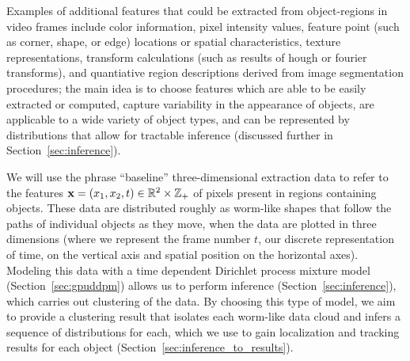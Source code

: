 \documentclass[twocolumn, final]{svjour3}
\begin{document}
Examples of additional features that could be extracted from object-regions in video frames include color information, pixel intensity values, feature point (such as corner, shape, or edge) locations or spatial characteristics, texture representations, transform calculations (such as results of hough or fourier transforms), and quantiative region descriptions derived from image segmentation procedures; the main idea is to choose features which are able to be easily extracted or computed, capture variability in the appearance of objects, are applicable to a wide variety of object types, and can be represented by distributions that allow for tractable inference (discussed further in Section~\ref{sec:inference}).

We will use the phrase ``baseline'' three-dimensional extraction data to refer to the features $\bold{x} = ( x_{1}, x_{2}, t ) \in \mathbb{R}^{2} \times \mathbb{Z}_{+}$ of pixels present in regions containing objects. These data are distributed roughly as worm-like shapes that follow the paths of individual objects as they move, when the data are plotted in three dimensions (where we represent the frame number $t$, our discrete representation of time, on the vertical axis and spatial position on the horizontal axes). Modeling this data with a time dependent Dirichlet process mixture model (Section~\ref{sec:gpuddpm}) allows us to perform inference (Section~\ref{sec:inference}), which carries out clustering of the data. By choosing this type of model, we aim to provide a clustering result that isolates each worm-like data cloud and infers a sequence of distributions for each, which we use to gain localization and tracking results for each object (Section~\ref{sec:inference_to_results}).




\end{document}
